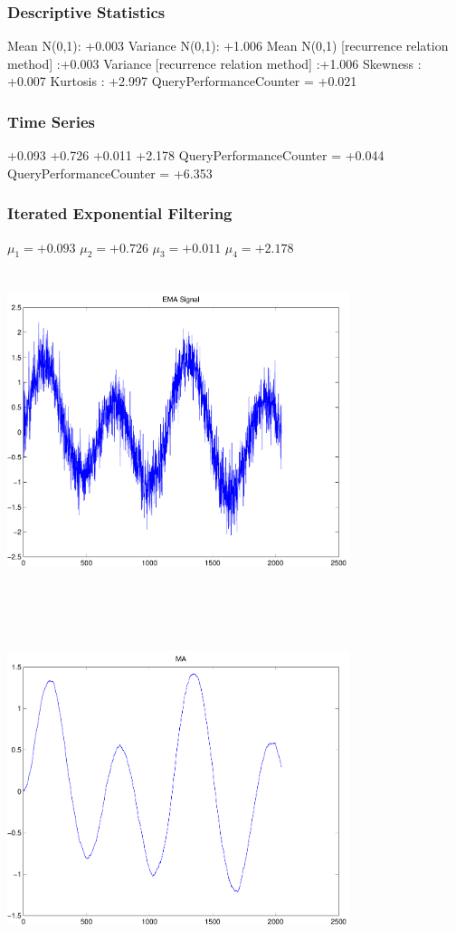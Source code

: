 \documentclass[9pt]{article}
\theoremstyle{plain}
\theoremstyle{definition}
\theoremstyle{remark}
\numberwithin{equation}{section}
\begin{document}
\subsubsection{Descriptive Statistics}
Mean N(0,1): +0.003
Variance N(0,1): +1.006
Mean N(0,1) [recurrence relation method] :+0.003
Variance [recurrence relation method] :+1.006
Skewness : +0.007
Kurtosis : +2.997
QueryPerformanceCounter  =  +0.021
\subsubsection{Time Series }
+0.093
+0.726
+0.011
+2.178
QueryPerformanceCounter  =  +0.044
QueryPerformanceCounter  =  +6.353
\subsubsection{Iterated Exponential Filtering }
$\mu_1 =+0.093$
$\mu_2 =+0.726$
$\mu_3 =+0.011$
$\mu_4 =+2.178$
\includegraphics[width=10.0cm,height=10.0cm]{EMA_signal.pdf}

\includegraphics[width=10.0cm,height=10.0cm]{MA.pdf}
\end{document}
